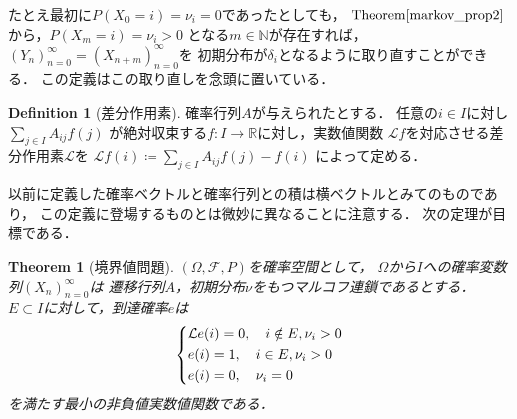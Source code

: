 \documentclass[dvipdfmx,autodetect-engine]{jsarticle}
\newtheorem{theorem}{Theorem}[section]
\theoremstyle{remark}
\theoremstyle{definition}
\newtheorem{definition}{Definition}[section]
\newcommand{\R}{\mathbb{R}}
\newcommand{\N}{\mathbb{N}}
\begin{document}
たとえ最初に$P(X_0 = i) = \nu_i = 0$であったとしても，
$\mathrm{Theorem}\ref{markov_prop2}$から，$P(X_m = i)=\nu_i >0$
となる$m \in \N$が存在すれば，
$(Y_n)_{n=0}^{\infty}=(X_{n+m})_{n=0}^{\infty}$を
初期分布が$\delta_i$となるように取り直すことができる．
この定義はこの取り直しを念頭に置いている．


\begin{definition}[差分作用素]
    確率行列$A$が与えられたとする．
    任意の$i \in I$に対し$\sum_{j \in I} A_{ij}f(j)$
    が絶対収束する$f\colon I \to \R$に対し，実数値関数
    $\mathcal{L}f$を対応させる差分作用素$\mathcal{L}$を
    $\mathcal{L}f(i) \coloneqq \sum_{j \in I} A_{ij}f(j) - f(i)$
    によって定める．
\end{definition}


以前に定義した確率ベクトルと確率行列との積は横ベクトルとみてのものであり，
この定義に登場するものとは微妙に異なることに注意する．
次の定理が目標である．


\begin{theorem}[境界値問題]
    $(\Omega,\mathcal{F},P)$を確率空間として，
    $\Omega$から$I$への確率変数列$(X_n)_{n=0}^{\infty}$は
    遷移行列$A$，初期分布$\nu$をもつマルコフ連鎖であるとする．
    $E \subset I$に対して，到達確率$e$は
    \begin{align}
        \begin{dcases}
            \mathcal{L}e(i) = 0, \quad i \notin E,\nu_{i} >0\\
            e(i) = 1, \quad i \in E,\nu_{i}>0 \\
            e(i) = 0, \quad \nu_{i} = 0
        \end{dcases}
    \end{align}
    を満たす最小の非負値実数値関数である．
\end{theorem}
\end{document}
